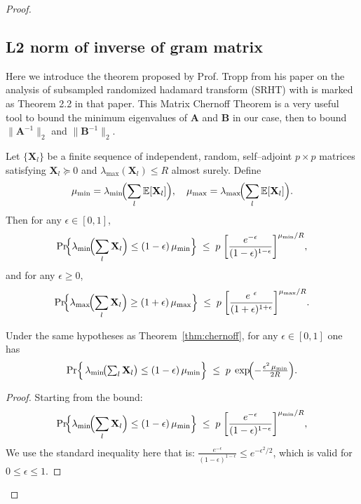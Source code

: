 \documentclass[11pt]{article}
\numberwithin{equation}{section}
\theoremstyle{plain}
\theoremstyle{definition}
\theoremstyle{remark}
\begin{document}
\begin{proof}
\subsection{L2 norm of inverse of gram matrix}
Here we introduce the theorem proposed by Prof. Tropp from his paper on the analysis of subsampled randomized hadamard transform (SRHT)\cite{tropp2011improvedanalysissubsampledrandomized} with is marked as Theorem 2.2 in that paper.
This Matrix Chernoff Theorem is a very useful tool to bound the minimum eigenvalues of \(\mathbf{A}\) and \(\mathbf{B}\) in our case, then to bound \(\|\mathbf{A}^{-1}\|_{2}\) and \(\|\mathbf{B}^{-1}\|_{2}\).
\begin{thm}
  \label{thm:chernoff}
  Let \(\{\mathbf X_l\}\) be a finite sequence of independent, random,
    self–adjoint \(p\times p\) matrices satisfying
    \(\mathbf X_l\succeq0\) and \(\lambda_{\max}(\mathbf X_l)\le R\)
    almost surely.  Define
    \[
    \mu_{\min}
      =\lambda_{\min}\!\Bigl(\sum_l\mathbb E[\mathbf X_l]\Bigr),
    \quad
    \mu_{\max}
      =\lambda_{\max}\!\Bigl(\sum_l\mathbb E[\mathbf X_l]\Bigr).
    \]
    Then for any \(\epsilon\in[0,1]\),
    \[
    \Pr\!\Bigl\{
      \lambda_{\min}\!\Bigl(\sum_l\mathbf X_l\Bigr)\le (1-\epsilon)\,\mu_{\min}
    \Bigr\}
    \;\le\;
    p\;\biggl[\frac{e^{-\epsilon}}{(1-\epsilon)^{1-\epsilon}}\biggr]^{\mu_{\min}/R},
    \]
    and for any \(\epsilon\ge0\),
    \[
    \Pr\!\Bigl\{
      \lambda_{\max}\!\Bigl(\sum_l\mathbf X_l\Bigr)\ge (1+\epsilon)\,\mu_{\max}
    \Bigr\}
    \;\le\;
    p\;\biggl[\frac{e^{\ \epsilon}}{(1+\epsilon)^{1+\epsilon}}\biggr]^{\mu_{\max}/R}.
    \]
\end{thm}


  \begin{cor}
    \label{cor:simplified}

    Under the same hypotheses as Theorem~\ref{thm:chernoff}, for any \(\epsilon\in[0,1]\) one has
    \[
      \Pr\Bigl\{\,
        \lambda_{\min}\!\bigl(\textstyle\sum_{l}\mathbf{X}_l\bigr)
          \le (1-\epsilon)\,\mu_{\min}
        \Bigr\}
        \;\le\;
        p\;\exp\!\Bigl(-\tfrac{\epsilon^{2}\,\mu_{\min}}{2R}\Bigr).
    \]
  \end{cor}
    
    \begin{proof}
    Starting from the bound:
    \[
    \Pr\!\Bigl\{
      \lambda_{\min}\!\Bigl(\sum_l\mathbf X_l\Bigr)\le (1-\epsilon)\,\mu_{\min}
    \Bigr\}
    \;\le\;
    p\;\biggl[\frac{e^{-\epsilon}}{(1-\epsilon)^{1-\epsilon}}\biggr]^{\mu_{\min}/R},
    \]
    We use the standard inequality here that is:
    \(\tfrac{e^{-\epsilon}}{(1-\epsilon)^{1-\epsilon}}\le e^{-\epsilon^{2}/2}\),
    which is valid for \(0\le\epsilon\le1\).  
    

\end{proof}
\end{proof}
\end{document}
